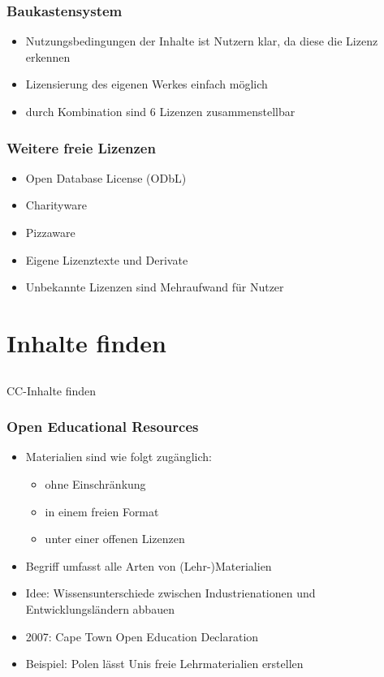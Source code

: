 \documentclass[table]{beamer}
\begin{document}
\begin{frame}
    \frametitle{Baukastensystem}
    \begin{itemize}
        \item<1-> Nutzungsbedingungen der Inhalte ist Nutzern klar, da diese die Lizenz erkennen
        \item<2-> Lizensierung des eigenen Werkes einfach möglich
        \item<3-> durch Kombination sind 6 Lizenzen zusammenstellbar
    \end{itemize}
\end{frame}

\begin{frame}
    \frametitle{Weitere freie Lizenzen}
    \begin{itemize}
        \item<2-> Open Database License (ODbL)
        \item<3-> Charityware
        \item<4-> Pizzaware
        \item<5-> Eigene Lizenztexte und Derivate
        \item<6-> Unbekannte Lizenzen sind Mehraufwand für Nutzer
    \end{itemize}
\end{frame}

\section{Inhalte finden}
\subsection{}

\begin{frame}
    \begin{center}\Large
    CC-Inhalte finden
    \end {center}
\end{frame}

\begin{frame}
  \frametitle{Open Educational Resources}
    \begin{itemize}
        \item<2-> Materialien sind wie folgt zugänglich:
            \begin{itemize}
                \item<3-> ohne Einschränkung
                \item<4-> in einem freien Format
                \item<5-> unter einer offenen Lizenzen 
            \end{itemize}
        \item<6-> Begriff umfasst alle Arten von (Lehr-)Materialien
        \item<7-> Idee: Wissensunterschiede zwischen Industrienationen und Entwicklungsländern abbauen
        \item<8-> 2007: Cape Town Open Education Declaration
        \item<9-> Beispiel: Polen lässt Unis freie Lehrmaterialien erstellen
    \end{itemize}
\end{frame}
\end{document}
